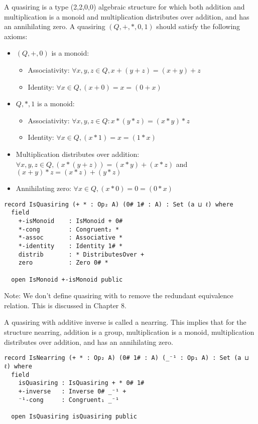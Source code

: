 A quasiring is a type (2,2,0,0) algebraic structure for which both addition and
multiplication is a monoid and multiplication distributes over addition, and has
an annihilating zero. A quasiring $(Q,+,*,0,1)$ should satisfy the following axioms:
\begin{itemize}
  \item $(Q,+,0)$ is a monoid:
  \begin{itemize}
    \item Associativity: $\forall x,y,z \in Q, x + (y + z) = (x + y) + z$
    \item Identity: $\forall x \in Q, (x + 0) = x = (0 + x)$
  \end{itemize}
  \item $Q,*,1$ is a monoid:
  \begin{itemize}
    \item Associativity: $ \forall x,y,z \in Q: x * (y*z)  = (x*y)*z$
    \item Identity: $\forall x \in Q, (x * 1) = x = (1 * x)$
  \end{itemize}
  \item Multiplication distributes over addition: \(\forall x , y , z \in Q, (x * (y + z)) = (x * y) + (x
  * z)\) and \( (x + y) * z = (x * z) + (y * z) \)
  \item Annihilating zero: \(\forall x \in Q, (x * 0) = 0 = (0 * x)\)
\end{itemize}

\begin{verbatim}
record IsQuasiring (+ * : Op₂ A) (0# 1# : A) : Set (a ⊔ ℓ) where
  field
    +-isMonoid    : IsMonoid + 0#
    *-cong        : Congruent₂ *
    *-assoc       : Associative *
    *-identity    : Identity 1# *
    distrib       : * DistributesOver +
    zero          : Zero 0# *

  open IsMonoid +-isMonoid public
\end{verbatim}
Note: We don't define quasiring with  to remove the redundant
equivalence relation. This is discussed in Chapter 8.

A quasiring with additive inverse is called a nearring. This implies that for
the structure nearring, addition is a group, multiplication is a monoid,
multiplication distributes over addition, and has an annihilating zero.

\begin{verbatim}
record IsNearring (+ * : Op₂ A) (0# 1# : A) (_⁻¹ : Op₁ A) : Set (a ⊔ ℓ) where
  field
    isQuasiring : IsQuasiring + * 0# 1#
    +-inverse   : Inverse 0# _⁻¹ +
    ⁻¹-cong     : Congruent₁ _⁻¹

  open IsQuasiring isQuasiring public
\end{verbatim}

